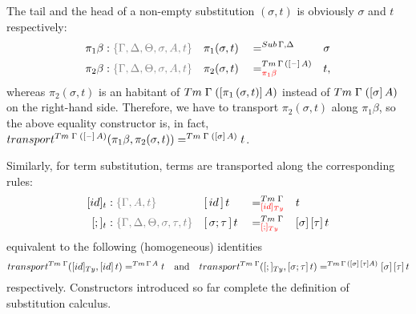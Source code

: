 \documentclass[a4paper,UKenglish,numberwithinsect,cleveref,thm-restate]{lipics-v2021}
\begin{document}
The tail and the head of a non-empty substitution $(\sigma, t)$ is obviously $\sigma$ and $t$ respectively:
\begin{alignat*}{5}
  \pi_1\beta      & : \implicit{\Gamma, \Delta, \Theta, \sigma, A, t} && \pi_1(\sigma , t)        && =^{\Sub\,\Gamma,\Delta} &&  \sigma \\
  \pi_2\beta      & : \implicit{\Gamma, \Delta, \Theta, \sigma, A, t} && \pi_2(\sigma , t)        && =^{\Tm\,\Gamma\,([\blank]\,A)}_{\alert{\pi_1\beta}} &&  t, 
\end{alignat*}
whereas $\pi_2(\sigma, t)$ is an habitant of $\Tm\;\Gamma\;([\pi_1\,(\sigma, t)]\,A)$ instead of $\Tm\;\Gamma\;([\sigma]\,A)$ on the right-hand side. 
Therefore, we have to transport $\pi_2(\sigma, t)$ along $\pi_1\beta$, so the above equality constructor is, in fact, $\transfib{\Tm\;\Gamma\;([\blank]\,A)}{\pi_1\beta}{\pi_2(\sigma, t)} =^{\Tm\;\Gamma\;([\sigma]\,A)} t$.

Similarly, for term substitution, terms are transported along the corresponding rules:
\begin{alignat*}{5}
  [\idS]_t         & : \implicit{\Gamma, A, t} && {[\,\idS\,]\,t}         && =^{\Tm\;\Gamma}_{\alert{[\idS]_\Ty}}  && t \\
  [;]_t            & : \implicit{\Gamma, \Delta, \Theta, \sigma, \tau, t} && {[\,\sigma ; \tau\,]\,t} && =^{\Tm\;\Gamma}_{\alert{[;]_{\Ty}}}   && {[ \sigma ]\,[ \tau ]\,t}
\end{alignat*}
equivalent to the following (homogeneous) identities
\[
  \transfib{\Tm\;\Gamma}{[\idS]_{\Ty}}{[\idS]\,t} =^{\Tm\,\Gamma\,A} t
  \quad\text{and}\quad
  \transfib{\Tm\;\Gamma}{[;]_{\Ty}}{[\sigma;\tau]\,t} =^{\Tm\,\Gamma\,([\sigma]\,[\tau]A)} [\sigma]\,[\tau]\,t
\]
respectively.
Constructors introduced so far complete the definition of substitution calculus.
\end{document}
